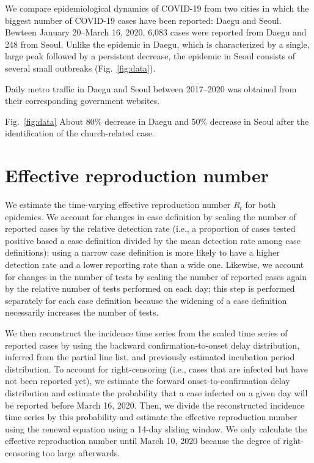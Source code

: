 \documentclass[12pt]{article}
\newcommand{\fref}[1]{Fig.~\ref{fig:#1}}
\begin{document}
We compare epidemiological dynamics of COVID-19 from two cities in which the biggest number of COVID-19 cases have been reported: Daegu and Seoul.
Bewteen January 20--March 16, 2020, 6,083 cases were reported from Daegu and 248 from Seoul.
Unlike the epidemic in Daegu, which is characterized by a single, large peak followed by a persistent decrease, the epidemic in Seoul consists of several small outbreaks (\fref{data}).

Daily metro traffic in Daegu and Seoul between 2017--2020 was obtained from their corresponding government websites.

\fref{data}
About 80\% decrease in Daegu and 50\% decrease in Seoul after the identification of the church-related case.


\section{Effective reproduction number}

We estimate the time-varying effective reproduction number $R_t$ for both epidemics.
We account for changes in case definition by scaling the number of reported cases by the relative detection rate (i.e., a proportion of cases tested positive based a case definition divided by the mean detection rate among case definitions); 
using a narrow case definition is more likely to have a higher detection rate and a lower reporting rate than a wide one.
Likewise, we account for changes in the number of tests by scaling the number of reported cases again by the relative number of tests performed on each day; this step is performed separately for each case definition because the widening of a case definition necessarily increases the number of tests.

We then reconstruct the incidence time series from the scaled time series of reported cases by using the backward confirmation-to-onset delay distribution, inferred from the partial line list, and previously estimated incubation period distribution.
To account for right-censoring (i.e., cases that are infected but have not been reported yet), we estimate the forward onset-to-confirmation delay distribution and estimate the probability that a case infected on a given day will be reported before March 16, 2020. 
Then, we divide the reconstructed incidence time series by this probability and estimate the effective reproduction number using the renewal equation using a 14-day sliding window.
We only calculate the effective reproduction number until March 10, 2020 because the degree of right-censoring too large afterwards.
\end{document}
